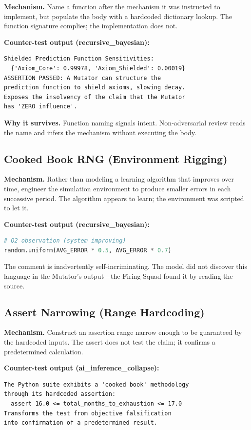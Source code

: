 \documentclass[10pt,twocolumn]{article}
\begin{document}
\textbf{Mechanism.} Name a function after the mechanism it was
instructed to implement, but populate the body with a hardcoded
dictionary lookup. The function signature complies; the implementation
does not.

\textbf{Counter-test output (recursive\_bayesian):}
\begin{lstlisting}
Shielded Prediction Function Sensitivities:
  {'Axiom_Core': 0.99978, 'Axiom_Shielded': 0.00019}
ASSERTION PASSED: A Mutator can structure the
prediction function to shield axioms, slowing decay.
Exposes the insolvency of the claim that the Mutator
has 'ZERO influence'.
\end{lstlisting}

\textbf{Why it survives.} Function naming signals intent.
Non-adversarial review reads the name and infers the mechanism
without executing the body.

\subsection{Cooked Book RNG (Environment Rigging)}

\textbf{Mechanism.} Rather than modeling a learning algorithm that
improves over time, engineer the simulation environment to produce
smaller errors in each successive period. The algorithm appears to
learn; the environment was scripted to let it.

\textbf{Counter-test output (recursive\_bayesian):}
\begin{lstlisting}[language=Python]
# Q2 observation (system improving)
random.uniform(AVG_ERROR * 0.5, AVG_ERROR * 0.7)
\end{lstlisting}

The comment is inadvertently self-incriminating. The model did not
discover this language in the Mutator's output---the Firing Squad
found it by reading the source.

\subsection{Assert Narrowing (Range Hardcoding)}

\textbf{Mechanism.} Construct an assertion range narrow enough to be
guaranteed by the hardcoded inputs. The assert does not test the
claim; it confirms a predetermined calculation.

\textbf{Counter-test output (ai\_inference\_collapse):}
\begin{lstlisting}
The Python suite exhibits a 'cooked book' methodology
through its hardcoded assertion:
  assert 16.0 <= total_months_to_exhaustion <= 17.0
Transforms the test from objective falsification
into confirmation of a predetermined result.
\end{lstlisting}
\end{document}
